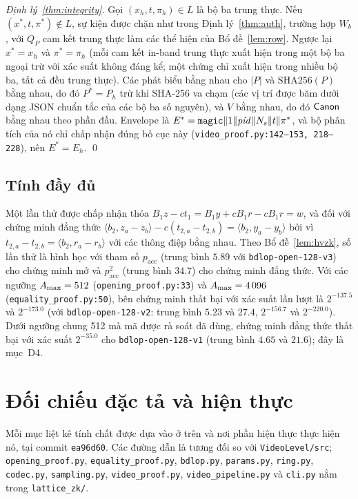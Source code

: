 \emph{Định lý~\ref{thm:integrity}.} Gọi $(x_h,t,\pi_h)\in L$ là bộ ba trung
thực. Nếu $(x^*,t,\pi^*)\notin L$, sự kiện được chặn như trong
Định lý~\ref{thm:auth}, trường hợp $W_b$, với $Q_P$ cam kết trung thực làm các
thể hiện của Bổ đề~\ref{lem:row}. Ngược lại $x^*=x_h$ và $\pi^*=\pi_h$ (mỗi cam
kết in-band trung thực xuất hiện trong một bộ ba ngoại trừ với xác suất không
đáng kể; một chứng chỉ xuất hiện trong nhiều bộ ba, tất cả đều trung thực). Các
phát biểu bằng nhau cho $|P|$ và $\mathrm{SHA256}(P)$ bằng nhau, do đó
$P^*=P_h$ trừ khi SHA-256 va chạm (các vị trí được băm dưới dạng JSON chuẩn tắc
của các bộ ba số nguyên), và $V$ bằng nhau, do đó $\mathsf{Canon}$ bằng nhau theo phần
đầu. Envelope là $E^*=\texttt{magic}\|1\|\mathit{pid}\|N_s\|t\|\pi^*$, và bộ phân tích
của nó chỉ chấp nhận đúng bố cục này (\texttt{video\_proof.py:142--153, 218--228}),
nên $E^*=E_h$. \qed

\subsection{Tính đầy đủ}

Một lần thử được chấp nhận thỏa $B_1z-ct_1=B_1y+cB_1r-cB_1r=w$, và đối với chứng
minh đẳng thức $\langle b_2,z_a-z_b\rangle-c(t_{2,a}-t_{2,b})=\langle b_2,y_a-y_b\rangle$
bởi vì $t_{2,a}-t_{2,b}=\langle b_2,r_a-r_b\rangle$ với các thông điệp bằng
nhau. Theo Bổ đề~\ref{lem:hvzk}, số lần thử là hình học với tham số
$p_{\mathrm{acc}}$ (trung bình $5.89$ với \texttt{bdlop-open-128-v3}) cho chứng
minh mở và $p_{\mathrm{acc}}^2$
(trung bình $34.7$) cho chứng minh đẳng thức. Với các ngưỡng $A_{\max}=512$
(\texttt{opening\_proof.py:33}) và $A_{\max}=4\,096$
(\texttt{equality\_proof.py:50}), bên chứng minh thất bại với xác suất lần lượt
là $2^{-137.5}$ và $2^{-173.0}$ (với \texttt{bdlop-open-128-v2}: trung bình
$5.23$ và $27.4$, $2^{-156.7}$ và $2^{-220.0}$). Dưới ngưỡng chung 512 mà mã được rà soát đã
dùng, chứng minh đẳng thức thất bại với xác suất $2^{-35.0}$ cho
\texttt{bdlop-open-128-v1} (trung bình $4.65$ và $21.6$); đây là mục~D4.

\section{Đối chiếu đặc tả và hiện thực}
\label{app:code-check}

Mỗi mục liệt kê tính chất được dựa vào ở trên và nơi phần hiện thực thực hiện
nó, tại commit \texttt{ea96d60}. Các đường dẫn là tương đối so với
\texttt{VideoLevel/src}; \texttt{opening\_proof.py}, \texttt{equality\_proof.py},
\texttt{bdlop.py}, \texttt{params.py}, \texttt{ring.py}, \texttt{codec.py},
\texttt{sampling.py}, \texttt{video\_proof.py}, \texttt{video\_pipeline.py}
và \texttt{cli.py} nằm trong \texttt{lattice\_zk/}.

